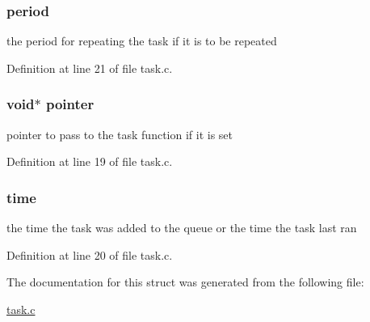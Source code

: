 \subsubsection[{period}]{ period}\label{structtask__t_abed99c1776ff770f1377d8f97a366a4b}
the period for repeating the task if it is to be repeated 

Definition at line 21 of file task.\+c.

\hypertarget{structtask__t_abc7cbbec1f024bd23164936bd765b06d}{}
\subsubsection[{pointer}]{\setlength{\rightskip}{0pt plus 5cm}void$\ast$ pointer}\label{structtask__t_abc7cbbec1f024bd23164936bd765b06d}
pointer to pass to the task function if it is set 

Definition at line 19 of file task.\+c.

\hypertarget{structtask__t_a05fc1718d6d2f42ca52a95e8e3067111}{}
\subsubsection[{time}]{ time}\label{structtask__t_a05fc1718d6d2f42ca52a95e8e3067111}
the time the task was added to the queue or the time the task last ran 

Definition at line 20 of file task.\+c.



The documentation for this struct was generated from the following file\+:\begin{DoxyCompactItemize}
\item 
\hyperlink{task_8c}{task.\+c}\end{DoxyCompactItemize}
